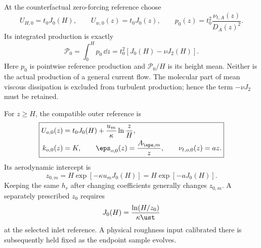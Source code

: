 At the counterfactual zero-forcing reference choose
\begin{equation}
 U_{H,0}=t_0J_0(H),\qquad U_{w,0}(z)=t_0J_0(z),\qquad
 p_0(z)=t_0^2\frac{\nu_{t,A}(z)}{D_A(z)^2}.
 \label{mawf:reference-production}
\end{equation}
Its integrated production is exactly
\begin{equation}
 \boxed{\mathcal P_0=\int_0^H p_0\,\dd z
     =t_0^2[J_0(H)-\nu J_2(H)].}
 \label{mawf:production-budget}
\end{equation}
Here \(p_0\) is pointwise reference production and
\(\mathcal P_0/H\) is its height mean. Neither is the actual
production of a general current flow. The molecular part of mean
viscous dissipation is excluded from turbulent production; hence
the term \(-\nu J_2\) must be retained.

For \(z\ge H\), the compatible outer reference is
\begin{equation}
 \boxed{\begin{aligned}
 U_{o,0}(z)&=t_0J_0(H)+\frac{u_m}{\kappa}\ln\frac zH,\\
 k_{o,0}(z)&=K,\qquad
 \eps_{o,0}(z)=\frac{A_{\eps,m}}z,\qquad
 \nu_{t,o,0}(z)=az .
 \end{aligned}}
 \label{mawf:outer-reference}
\end{equation}
Its aerodynamic intercept is
\begin{equation}
 z_{0,m}=H\exp[-\kappa u_mJ_0(H)]=H\exp[-aJ_0(H)].
 \label{mawf:z0}
\end{equation}
Keeping the same \(h_r\) after changing coefficients generally
changes \(z_{0,m}\). A separately prescribed \(z_0\) requires
\begin{equation}
 J_0(H)=\frac{\ln(H/z_0)}{\kappa\ust}
 \label{mawf:z0-calibration}
\end{equation}
at the selected inlet reference. A physical roughness input calibrated
there is subsequently held fixed as the endpoint sample evolves.

